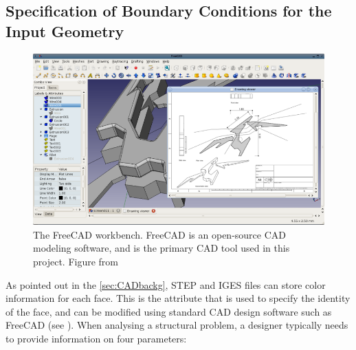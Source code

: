 \subsection{Specification of Boundary Conditions for the Input Geometry}
\label{sec: GeomCreation}

\begin{figure}
\centering
  \includegraphics[scale=0.75]{Pictures/CADToVoxel/FreeCAD.png}
\caption{The FreeCAD workbench. FreeCAD is an open-source CAD modeling software, and is the primary CAD tool used in this project. Figure from \cite{FreeCAD}}
\label{fig: freeCAD}
\end{figure}

As pointed out in the \ref{sec:CADbackg}, STEP and IGES files can store color information for each face. This is the attribute that is used to specify the identity of the face, and can be modified using standard CAD design software such as FreeCAD (see \cite{FreeCAD}). When analysing a structural problem, a designer typically needs to provide information on four parameters:

